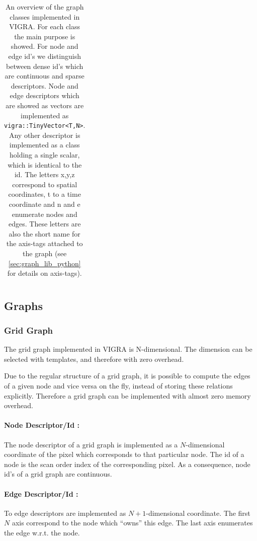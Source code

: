 \begin{table}
\begin{tiny}
\begin{tabular}{|l|p{1.5cm}|p{0.5cm}|p{0.5cm}|p{0.6cm}|p{0.6cm}|p{0.6cm}|p{0.8cm}|p{0.8cm}|l|l|l|}
\end{tabular}
\end{tiny}
\caption[VIGRA's graph classes]{
    An overview of the graph classes implemented in VIGRA.
    For each class the main purpose is showed.
    For node and edge id's we distinguish between dense id's
    which are continuous and sparse descriptors.
    Node and edge descriptors which are showed as vectors 
    are implemented as \lstinline{vigra::TinyVector<T,N>}.
    Any other descriptor is implemented as a class holding
    a single scalar, which is identical to the id.
    The letters x,y,z correspond to spatial coordinates, t to a time coordinate
    and n and e enumerate nodes and edges.
    These letters are also the short name for the axis-tags attached to the
    graph (see \cref{sec:graph_lib_python} for details on axis-tags).
}
\end{table}


\subsection{Graphs}

\subsubsection{Grid Graph} \label{sec:graphs_grid_graph}

The grid graph implemented in VIGRA is N-dimensional.
The dimension can be selected with templates, and therefore with zero
overhead.

Due to the regular structure of a grid graph, it is possible to compute the edges of a given 
node and vice versa on the fly, instead of storing these relations explicitly.
Therefore a grid graph can be implemented with almost zero memory overhead.

\paragraph{Node Descriptor/Id :}
The node descriptor of a grid graph is implemented as a
$N$-dimensional coordinate of the pixel which corresponds to
that particular node. The id of a node is the scan order index
of the corresponding pixel.
As a consequence, node id's of a grid graph are continuous.
\paragraph{Edge Descriptor/Id :}
To edge descriptors are implemented as $N+1$-dimensional coordinate.
The first $N$ axis correspond to the node which ``owns'' this edge.
The last axis enumerates the edge w.r.t. the node.

